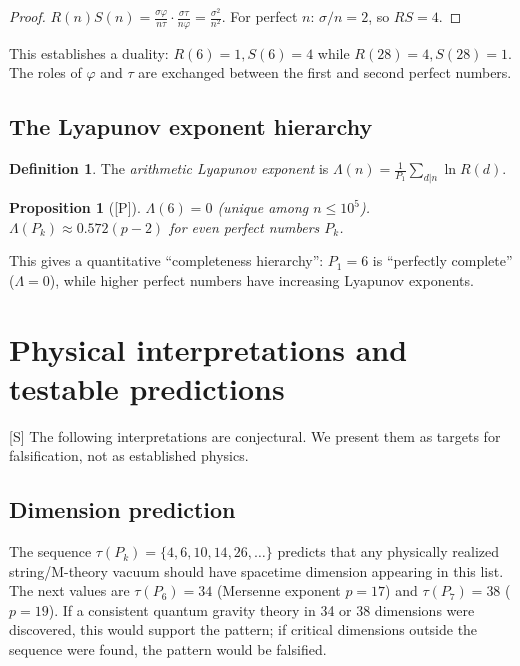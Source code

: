 \documentclass[11pt,letterpaper]{article}
\newtheorem{proposition}[theorem]{Proposition}
\theoremstyle{definition}
\newtheorem{definition}[theorem]{Definition}
\theoremstyle{remark}
\newcommand{\proven}{\textsf{[P]}}
\newcommand{\speculative}{\textsf{[S]}}
\begin{document}
\begin{proof}
$R(n)S(n) = \frac{\sigma\varphi}{n\tau}\cdot\frac{\sigma\tau}{n\varphi} = \frac{\sigma^2}{n^2}$.
For perfect $n$: $\sigma/n = 2$, so $RS = 4$.
\end{proof}

This establishes a duality: $R(6) = 1, S(6) = 4$ while $R(28) = 4, S(28) = 1$.
The roles of $\varphi$ and $\tau$ are exchanged between the first and second 
perfect numbers.

\subsection{The Lyapunov exponent hierarchy}

\begin{definition}
The \emph{arithmetic Lyapunov exponent} is 
$\Lambda(n) = \frac{1}{P_1}\sum_{d|n} \ln R(d)$.
\end{definition}

\begin{proposition}[\proven]\label{prop:lyapunov}
$\Lambda(6) = 0$ (unique among $n \leq 10^5$).
$\Lambda(P_k) \approx 0.572(p-2)$ for even perfect numbers $P_k$.
\end{proposition}

This gives a quantitative ``completeness hierarchy'': $P_1 = 6$ is 
``perfectly complete'' ($\Lambda = 0$), while higher perfect numbers 
have increasing Lyapunov exponents.

\section{Physical interpretations and testable predictions}
\label{sec:predictions}

\speculative{} The following interpretations are conjectural. We present 
them as targets for falsification, not as established physics.

\subsection{Dimension prediction}

The sequence $\tau(P_k) = \{4, 6, 10, 14, 26, \ldots\}$ predicts that 
any physically realized string/M-theory vacuum should have spacetime 
dimension appearing in this list. 
The next values are $\tau(P_6) = 34$ (Mersenne exponent $p=17$) and 
$\tau(P_7) = 38$ ($p=19$). 
If a consistent quantum gravity theory in 34 or 38 dimensions were discovered, 
this would support the pattern; if critical dimensions outside the sequence 
were found, the pattern would be falsified.
\end{document}
